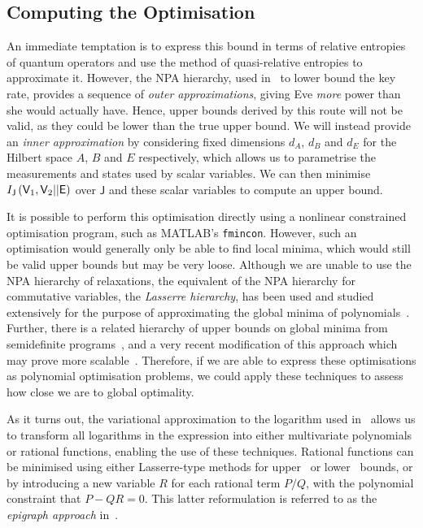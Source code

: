 \documentclass[10pt, a4paper]{article}
\numberwithin{equation}{section} %
\theoremstyle{definition}
\theoremstyle{plain}
\newcommand{\?}{\mathrel{?}} %
\newcommand{\crv}[1]{\mathsf{#1}}
\begin{document}
                  \subsection{Computing the Optimisation}

                  An immediate temptation is to express this bound in terms of relative entropies of quantum operators and use the method of quasi-relative entropies to approximate it. However, the NPA hierarchy, used in~\cite{BFF_QRE} to lower bound the key rate, provides a sequence of \emph{outer approximations}, giving Eve \emph{more} power than she would actually have. Hence, upper bounds derived by this route will not be valid, as they could be lower than the true upper bound. We will instead provide an \emph{inner approximation} by considering fixed dimensions \(d_A\), \(d_B\) and \(d_E\) for the Hilbert space \(A\), \(B\) and \(E\) respectively, which allows us to parametrise the measurements and states used by scalar variables. We can then minimise \(\splitkey{\crv{V}_1,\crv{V}_2}{\crv{E}}\) over \(\crv{J}\) and these scalar variables to compute an upper bound.

                  It is possible to perform this optimisation directly using a nonlinear constrained optimisation program, such as MATLAB's \verb`fmincon`. However, such an optimisation would generally only be able to find local minima, which would still be valid upper bounds but may be very loose. Although we are unable to use the NPA hierarchy of relaxations, the equivalent of the NPA hierarchy for commutative variables, the \emph{Lasserre hierarchy}, has been used and studied extensively for the purpose of approximating the global minima of polynomials~\cite{LasserreHierarchy}. Further, there is a related hierarchy of upper bounds on global minima from semidefinite programs~\cite{UpperBoundsHierarchy}, and a very recent modification of this approach which may prove more scalable~\cite{LasserreUpperBoundsPushForward}. Therefore, if we are able to express these optimisations as polynomial optimisation problems, we could apply these techniques to assess how close we are to global optimality.

                  As it turns out, the variational approximation to the logarithm used in~\cite{BFF_QRE} allows us to transform all logarithms in the expression into either multivariate polynomials or rational functions, enabling the use of these techniques. Rational functions can be minimised using either Lasserre-type methods for upper~\cite{MinRational} or lower~\cite{MinRationalLower} bounds, or by introducing a new variable \(R\) for each rational term \(P/Q\), with the polynomial constraint that \(P - QR = 0\). This latter reformulation is referred to as the \emph{epigraph approach} in~\cite{MinRationalLower}.
\end{document}
